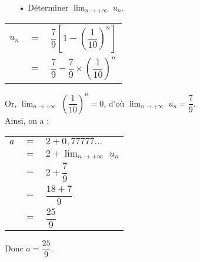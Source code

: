 \begin{itemize}
\item[•] Déterminer $\displaystyle {\lim_{n \rightarrow +\infty}} \; u_n$.
\end{itemize}

\vspace*{.3cm}

\begin{tabular}{lll}
$u_n$ & $=$ & $\dfrac{7}{9}\left[1-\left(\dfrac{1}{10}\right)^n\right]$ \vspace*{.3cm} \\
& $=$ & $\dfrac{7}{9} - \dfrac{7}{9} \times \left(\dfrac{1}{10}\right)^n$ \vspace*{.3cm} \\
\end{tabular}

Or, $\displaystyle {\lim_{n \rightarrow +\infty}} \; \left(\dfrac{1}{10}\right)^n = 0$, d'où $\displaystyle {\lim_{n \rightarrow +\infty}} \; u_n = \dfrac{7}{9}$. \vspace*{.3cm} \\

Ainsi, on a : \\

\begin{tabular}{lll}
$a$ & $=$ & $2 + 0,77777...$ \vspace*{.3cm} \\
& $=$ & $2 + \displaystyle {\lim_{n \rightarrow +\infty}} \; u_n$ \vspace*{.3cm} \\
& $=$ & $2 + \dfrac{7}{9}$ \vspace*{.3cm} \\
& $=$ & $\dfrac{18 + 7}{9}$ \vspace*{.3cm} \\
& $=$ & $\dfrac{25}{9}$ \\
\end{tabular}

\vspace*{.3cm}

Donc $a = \dfrac{25}{9}$.

\vspace*{-5cm}


\ifdefined\COMPLETE
\else
    
\fi